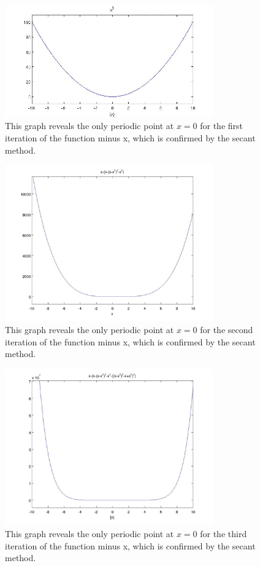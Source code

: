 \documentclass[12pt]{article}
\newenvironment{myenv}{\begin{adjustwidth}{1cm}{}}{\end{adjustwidth}}
\begin{document}
\begin{myenv}
\begin{figure} [H]
    \centering
    \includegraphics[width=0.8\textwidth]{2_3c_1}
    \caption{This graph reveals the only periodic point at $x=0$ for the first iteration of the function minus x, which is confirmed by the secant method.}
    \label{figure:a4}
\end{figure}

\begin{figure} [H]
    \centering
    \includegraphics[width=0.8\textwidth]{2_3c_2}
    \caption{This graph reveals the only periodic point at $x=0$ for the second iteration of the function minus x, which is confirmed by the secant method.}
    \label{figure:a4}
\end{figure}

\begin{figure} [H]
    \centering
    \includegraphics[width=0.8\textwidth]{2_3c_3}
    \caption{This graph reveals the only periodic point at $x=0$ for the third iteration of the function minus x, which is confirmed by the secant method.}
    \label{figure:a4}
\end{figure}
\end{myenv}
\end{document}
